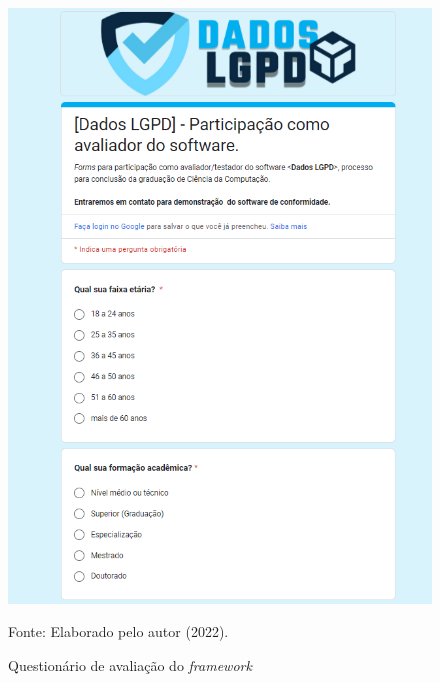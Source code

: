 \documentclass[
	12pt,				%
	openright,			%
	oneside,			%
	a4paper,			%
	english,			%
	french,				%
	spanish,			%
	brazil,				%
	]{abntex2}
\begin{document}
\begin{figure}[ht]
    \centering
    \caption{Questionário de avaliação do \textit{framework}}
    \includegraphics[width=5.0in]{Images/forms.png}
    \label{fig: forms}
    
    \centering \small Fonte: Elaborado pelo autor (2022).
\end{figure}
\end{document}
